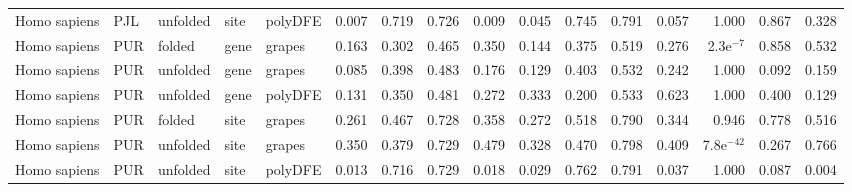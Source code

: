\begin{longtable}{lllllrrrrrrrrrrr}
        Homo sapiens &                       PJL &  unfolded &  site &  polyDFE &                              0.007 &                               0.719 &                 0.726 &                 0.009 &                              0.045 &                               0.745 &                 0.791 &                 0.057 &         1.000 &  0.867 &  0.328 \\
        Homo sapiens &                       PUR &    folded &  gene &   grapes &                              0.163 &                               0.302 &                 0.465 &                 0.350 &                              0.144 &                               0.375 &                 0.519 &                 0.276 &   2.3e$^{-7}$ &  0.858 &  0.532 \\
        Homo sapiens &                       PUR &  unfolded &  gene &   grapes &                              0.085 &                               0.398 &                 0.483 &                 0.176 &                              0.129 &                               0.403 &                 0.532 &                 0.242 &         1.000 &  0.092 &  0.159 \\
        Homo sapiens &                       PUR &  unfolded &  gene &  polyDFE &                              0.131 &                               0.350 &                 0.481 &                 0.272 &                              0.333 &                               0.200 &                 0.533 &                 0.623 &         1.000 &  0.400 &  0.129 \\
        Homo sapiens &                       PUR &    folded &  site &   grapes &                              0.261 &                               0.467 &                 0.728 &                 0.358 &                              0.272 &                               0.518 &                 0.790 &                 0.344 &         0.946 &  0.778 &  0.516 \\
        Homo sapiens &                       PUR &  unfolded &  site &   grapes &                              0.350 &                               0.379 &                 0.729 &                 0.479 &                              0.328 &                               0.470 &                 0.798 &                 0.409 &  7.8e$^{-42}$ &  0.267 &  0.766 \\
        Homo sapiens &                       PUR &  unfolded &  site &  polyDFE &                              0.013 &                               0.716 &                 0.729 &                 0.018 &                              0.029 &                               0.762 &                 0.791 &                 0.037 &         1.000 &  0.087 &  0.004 \\

\end{longtable}

